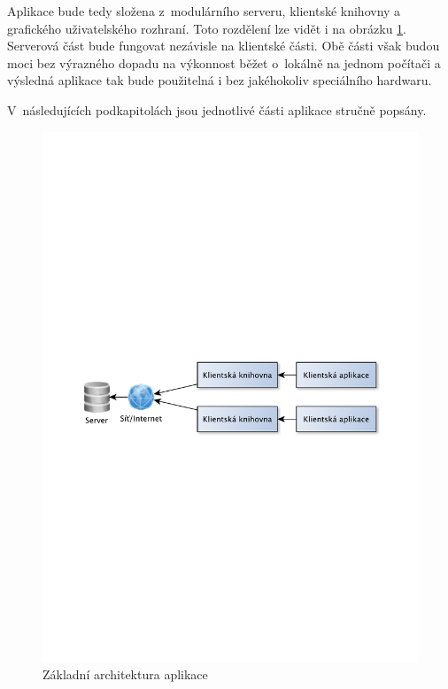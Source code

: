 Aplikace bude tedy složena z~modulárního serveru, klientské knihovny a grafického uživatelského rozhraní.
Toto rozdělení lze vidět i na obrázku \ref{fig:architektura}.
Serverová část bude fungovat nezávisle na klientské části. Obě části však budou
moci bez výrazného dopadu 
na výkonnost běžet o~lokálně na jednom počítači a výsledná aplikace tak bude použitelná i bez
jakéhokoliv speciálního hardwaru.

V~následujících podkapitolách jsou jednotlivé části aplikace stručně popsány.

\begin{figure}[h]
\centering
\includegraphics[trim=12cm 12cm 12cm 12cm, scale=0.8]{fig/princip}
\caption{Základní architektura aplikace} %
\label{fig:architektura}
\end{figure}

